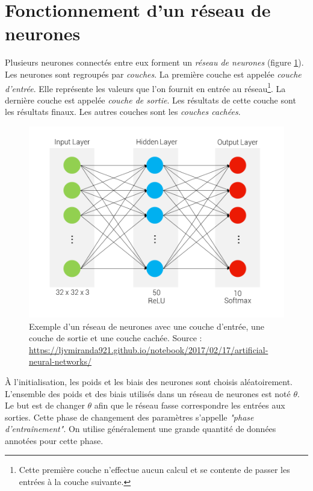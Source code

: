 \section{Fonctionnement d'un réseau de neurones}
Plusieurs neurones connectés entre eux forment un \textit{réseau de neurones} (figure \ref{fig:exemple_network}). Les neurones sont regroupés par \textit{couches}. La première couche est appelée \textit{couche d'entrée}. Elle représente les valeurs que l'on fournit en entrée au réseau\footnote{Cette première couche n'effectue aucun calcul et se contente de passer les entrées à la couche suivante.}. La dernière couche est appelée \textit{couche de sortie}. Les résultats de cette couche sont les résultats finaux. Les autres couches sont les \textit{couches cachées}.

\begin{figure}[!h]
\centering
\includegraphics[scale=0.5]{img/neural_ex.png}
\caption{Exemple d'un réseau de neurones avec une couche d'entrée, une couche de sortie et une couche cachée. Source :  \url{https://ljvmiranda921.github.io/notebook/2017/02/17/artificial-neural-networks/}}
\label{fig:exemple_network}
\end{figure}

À l'initialisation, les poids et les biais des neurones sont choisis aléatoirement. L'ensemble des poids et des biais utilisés dans un réseau de neurones est noté $\theta$. Le but est de changer $\theta$ afin que le réseau fasse correspondre les entrées aux sorties. Cette phase de changement des paramètres s'appelle \textit{"phase d'entraînement"}. On utilise généralement une grande quantité de données annotées pour cette phase.

